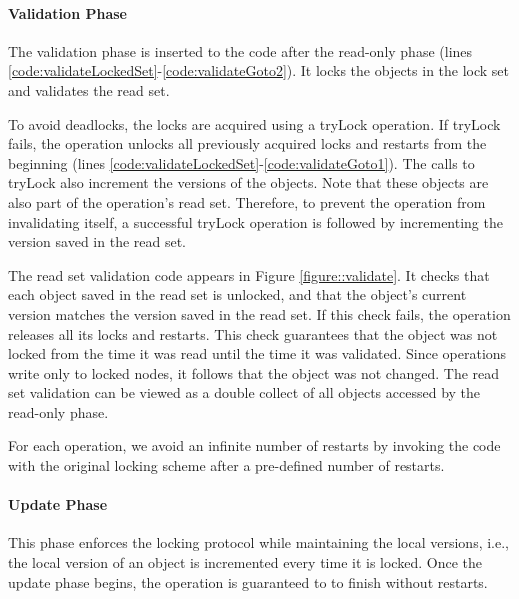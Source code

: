 
\paragraph{Validation Phase} 
The validation phase is inserted to the code after
the read-only phase (lines
\ref{code:validateLockedSet}-\ref{code:validateGoto2}). 
It locks the objects in the lock set and validates the read set. 

To avoid deadlocks, the locks are acquired using a tryLock
operation. If tryLock fails, the operation unlocks  all
previously acquired locks and restarts from the beginning 
(lines \ref{code:validateLockedSet}-\ref{code:validateGoto1}). 
The calls to tryLock also increment the versions 
of the objects. Note that these objects are also part of the 
operation's read set. Therefore, to prevent the operation from invalidating itself, 
a successful tryLock operation is followed by incrementing
the version saved in the read set.  

The read set validation code appears in Figure \ref{figure::validate}. 
It checks that each object saved in the read set is unlocked, 
and that the object's current version matches the version saved in the 
read set. If this check fails, the operation releases all its
locks and restarts. This check guarantees
that the object was not locked from the time it was read until
the time it was validated. Since operations write only to
locked nodes, it follows that the object was not changed.  
The read set validation can be viewed as a double collect 
of all objects accessed by the read-only phase. 

For each operation, we avoid an infinite number of restarts by invoking the code
with the original locking scheme after a pre-defined number of restarts.  



  
\paragraph{Update Phase} 
This phase enforces the locking protocol
  while maintaining the local versions, i.e., the local version of 
  an object is incremented every time it is locked.  
  Once the update phase begins, the operation is guaranteed to to 
  finish without restarts.  


